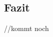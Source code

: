 \documentclass[conference]{IEEEtran}
\begin{document}
\subsection{Fazit}
//kommt noch

\end{document}

